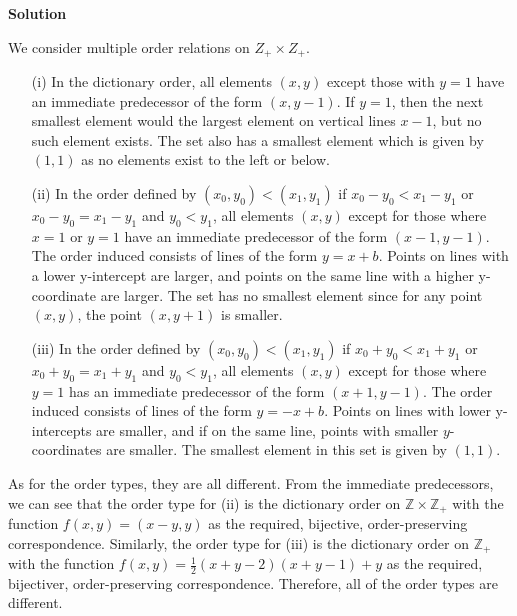 \documentclass[12pt]{article}
\newcounter{AnswerCounter}
\newcounter{SubAnswerCounter}
\newenvironment{answer}[0]{
  \setcounter{SubAnswerCounter}{1}
  \bigskip
  \textbf{Solution \arabic{AnswerCounter}}
  \\
  \begin{small}
}{
  \end{small}
  \stepcounter{AnswerCounter}
}
\begin{document}
\begin{answer}
We consider multiple order relations on $Z_+ \times Z_+$.
\begin{itemize}
\item[(i)] In the dictionary order, all elements $(x,y)$ except those with $y = 1$ have an immediate predecessor of the form $(x,y-1)$. If $y = 1$, then the next smallest element would the largest element on vertical lines $x-1$, but no such element exists. The set also has a smallest element which is given by $(1,1)$ as no elements exist to the left or below.
\item[(ii)] In the order defined by $(x_0,y_0) < (x_1,y_1)$ if $x_0 - y_0 < x_1 - y_1$ or $x_0 - y_0 = x_1 - y_1$ and $y_0 < y_1$, all elements $(x,y)$ except for those where $x = 1$ or $y = 1$ have an immediate predecessor of the form $(x - 1, y - 1)$. The order induced consists of lines of the form $y = x + b$. Points on lines with a lower y-intercept are larger, and points on the same line with a higher y-coordinate are larger. The set has no smallest element since for any point $(x,y)$, the point $(x,y+1)$ is smaller.
\item[(iii)] In the order defined by $(x_0,y_0) < (x_1,y_1)$ if $x_0 + y_0 < x_1 + y_1$ or $x_0 + y_0 = x_1 + y_1$ and $y_0 < y_1$, all elements $(x,y)$ except for those where $y=1$ has an immediate predecessor of the form $(x+1,y-1)$. The order induced consists of lines of the form $y = -x + b$. Points on lines with lower y-intercepts are smaller, and if on the same line, points with smaller $y$-coordinates are smaller. The smallest element in this set is given by $(1,1)$.
\end{itemize}
As for the order types, they are all different. From the immediate predecessors, we can see that the order type for (ii) is the dictionary order on $\mathbb{Z} \times \mathbb{Z}_+$ with the function $f(x,y) = (x-y, y)$ as the required, bijective, order-preserving correspondence. Similarly, the order type for (iii) is the dictionary order on $\mathbb{Z}_+$ with the function $f(x,y) = \frac{1}{2}(x+y-2)(x+y-1) + y$ as the required, bijectiver, order-preserving correspondence. Therefore, all of the order types are different.
\end{answer}\\
\end{document}
